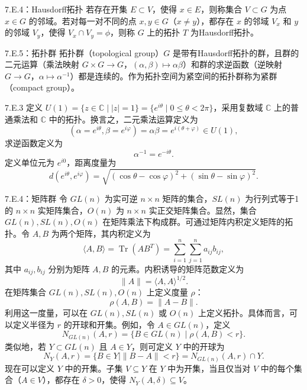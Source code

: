 \begin{bookdefinition}{7.E.4：Hausdorff拓扑}
若存在开集 $E\subset V$，使得 $x\in E$，则称集合 $V\subset G$ 为点 $x\in G$ 的邻域。若对每一对不同的点 $x,y\in G$（$x\ne y$），都存在 $x$ 的邻域 $V_x$ 和 $y$ 的邻域 $V_y$，使得 $V_x\cap V_y=\phi$，则称 $G$ 上的拓扑 $T$ 为Hausdorff拓扑。
\end{bookdefinition}

\begin{bookdefinition}{7.E.5：拓扑群}
拓扑群（topological group）$G$ 是带有Hausdorff拓扑的群，且群的二元运算（乘法映射 $G\times G\to G$，$(\alpha,\beta)\mapsto\alpha\beta$）和群的求逆函数（逆映射 $G\to G$，$\alpha\mapsto\alpha^{-1}$）都是连续的。作为拓扑空间为紧空间的拓扑群称为紧群（compact group）。
\end{bookdefinition}

\begin{bookexample}{7.E.3}
定义 $U(1)=\{z\in\mathbb C\mid|z|=1\}=\{e^{i\theta}\mid0\le\theta<2\pi\}$，采用复数域 $\mathbb C$ 上的普通乘法和 $\mathbb C$ 中的拓扑。换言之，二元乘法运算定义为
\[
(\alpha=e^{i\theta},\beta=e^{i\varphi})
 =\alpha\beta=e^{i(\theta+\varphi)}\in U(1),
\]
求逆函数定义为
\[
\alpha^{-1}=e^{-i\theta}.
\]
定义单位元为 $e^{i0}$，距离度量为
\[
d(e^{i\theta},e^{i\varphi})
 =\sqrt{(\cos\theta-\cos\varphi)^2+(\sin\theta-\sin\varphi)^2}.
\]
\end{bookexample}

\begin{bookexample}{7.E.4：矩阵群}
令 $GL(n)$ 为实可逆 $n\times n$ 矩阵的集合，$SL(n)$ 为行列式等于1的 $n\times n$ 实矩阵集合，$O(n)$ 为 $n\times n$ 实正交矩阵集合。显然，集合 $GL(n),SL(n),O(n)$ 在矩阵乘法下构成群。可通过矩阵内积定义矩阵的拓扑。令 $A,B$ 为两个矩阵，其内积定义为
\[
\langle A,B\rangle=\operatorname{Tr}(AB^T)
 =\sum_{i=1}^n\sum_{j=1}^na_{ij}b_{ij},
\]
其中 $a_{ij},b_{ij}$ 分别为矩阵 $A,B$ 的元素。内积诱导的矩阵范数定义为
\[
\|A\|=\langle A,A\rangle^{1/2}.
\]
在矩阵集合 $GL(n),SL(n),O(n)$ 上定义度量 $\rho$：
\[
\rho(A,B)=\|A-B\|.
\]
利用这一度量，可以在 $GL(n),SL(n)$ 或 $O(n)$ 上定义拓扑。具体而言，可以定义半径为 $r$ 的开球和开集。例如，令 $A\in GL(n)$，定义
\[
N_{GL(n)}(A,r)=\{B\in GL(n)\mid\rho(A,B)<r\}.
\]
类似地，若 $Y\subset GL(n)$ 且 $A\in Y$，则可定义 $Y$ 中的开球为
\[
N_Y(A,r)=\{B\in Y\mid\|B-A\|<r\}=N_{GL(n)}(A,r)\cap Y.
\]
现在可以定义 $Y$ 中的开集。子集 $V\subseteq Y$ 在 $Y$ 中为开集，当且仅当对 $V$ 中的每个集合（$A\in V$），都存在 $\delta>0$，使得 $N_Y(A,\delta)\subseteq V$。
\end{bookexample}

